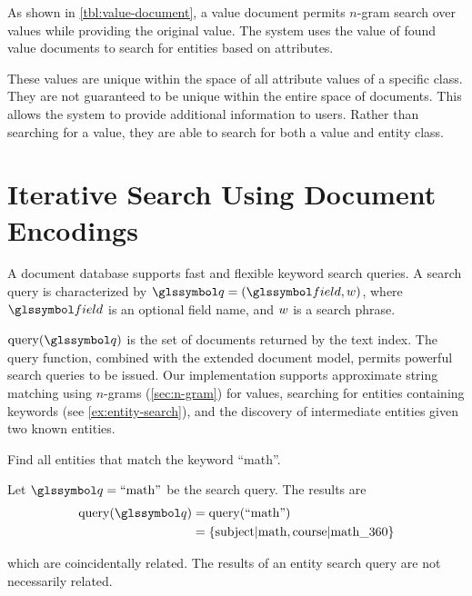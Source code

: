 		As shown in \cref{tbl:value-document}, a value document permits \(n\)-gram search over values while providing the original value.  The system uses the value of found value documents to search for entities based on attributes.
		
		These values are unique within the space of all attribute values of a specific class.  They are not guaranteed to be unique within the entire space of documents.  This allows the system to provide additional information to users.  Rather than searching for a value, they are able to search for both a value and entity class.
	
	\section{Iterative Search Using Document Encodings}
		A document database supports fast and flexible keyword search queries.	A search query is characterized by \(\q = (\field, \w)\), where \(\field\) is an optional field name, and \(w\) is a search phrase.
		
		\(\query(\q)\) is the set of documents returned by the text index.  The query function, combined with the extended document model, permits powerful search queries to be issued.  Our implementation supports approximate string matching using \(n\)-grams (\cref{sec:n-gram}) for values, searching for entities containing keywords (see \cref{ex:entity-search}), and the discovery of intermediate entities given two known entities.
		
		\begin{ex}
		\label{ex:entity-search}
			Find all entities that match the keyword ``math''.
			
			Let \(\q = \text{``math''}\) be the search query.  The results are
			\begin{align*}
				\query(\q) &= \query(\text{``math''}) \\
				&= \{\text{subject|math}, \text{course|math\_360}\}
			\end{align*}
			
			which are coincidentally related.  The results of an entity search query are not necessarily related.
		\end{ex}
		
